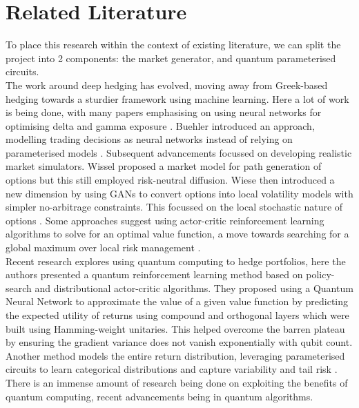 \documentclass[12pt]{article}
\numberwithin{equation}{section}
\begin{document}
\section{Related Literature}
To place this research within the context of existing literature, we can split 
the project into 2 components: the market generator, and quantum parameterised circuits.
\\
The work around deep hedging has evolved, moving away from 
Greek-based hedging towards a sturdier framework using machine 
learning. Here a lot of work is being done, with many papers emphasising 
on using neural networks for optimising delta and gamma exposure
\autocite{armstrong_deep_2024,qiao_enhancing_2024}.
Buehler introduced an approach, modelling trading decisions 
as neural networks instead of relying on parameterised models
\autocite{buehler_deep_2019}. Subsequent advancements focussed on developing realistic market simulators. Wissel 
proposed a market model for path generation of options but this still 
employed risk-neutral diffusion\autocite{schweizer_arbitrage-free_2008}. Wiese then introduced 
a new dimension by using GANs to convert options into 
local volatility models with simpler no-arbitrage constraints. This focussed 
on the local stochastic nature of options
\autocite{choudhary_funvol_2023,wiese_deep_2019,wiese_multi-asset_2021}.
Some approaches suggest using actor-critic reinforcement learning algorithms to 
solve for an optimal value function, a move towards searching for a global
maximum over local risk management
\autocite{buehler_deep_2022,movahed_introducing_2024}.
\\
Recent research explores using quantum computing to 
hedge portfolios, here the authors presented a quantum reinforcement learning 
method based on policy-search and distributional actor-critic algorithms. 
They proposed using a Quantum Neural Network to approximate the value of a 
given value function by predicting the expected utility of returns using compound and orthogonal layers which were built using Hamming-weight
unitaries\autocite{kerenidis_classical_2022}. This helped overcome the barren plateau by ensuring the gradient 
variance does not vanish exponentially with qubit count. Another method models the entire return distribution, leveraging parameterised circuits to learn categorical distributions and capture variability and tail risk 
\autocite{cherrat_quantum_2023,dasgupta_loading_2022}.
\\
There is an immense amount of research being done on exploiting the benefits of 
quantum computing, recent advancements being in quantum algorithms. 
\end{document}
